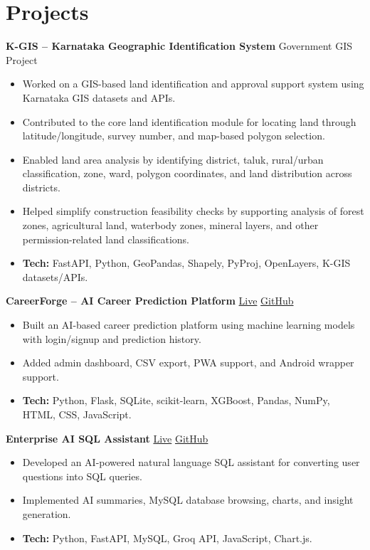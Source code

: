 \documentclass[a4paper,10pt]{article}
\newcommand{\entryspace}{\vspace{5pt}}
\begin{document}
\section*{Projects}
\textbf{K-GIS -- Karnataka Geographic Identification System} \hfill Government GIS Project
\begin{itemize}
    \item Worked on a GIS-based land identification and approval support system using Karnataka GIS datasets and APIs.
    \item Contributed to the core land identification module for locating land through latitude/longitude, survey number, and map-based polygon selection.
    \item Enabled land area analysis by identifying district, taluk, rural/urban classification, zone, ward, polygon coordinates, and land distribution across districts.
    \item Helped simplify construction feasibility checks by supporting analysis of forest zones, agricultural land, waterbody zones, mineral layers, and other permission-related land classifications.
    \item \textbf{Tech:} FastAPI, Python, GeoPandas, Shapely, PyProj, OpenLayers, K-GIS datasets/APIs.
\end{itemize}

\entryspace
\textbf{CareerForge -- AI Career Prediction Platform} \hfill
\href{https://careerforge-akvt.onrender.com}{Live} \textbar{}
\href{https://github.com/harsha-b-dev/CareerForge}{GitHub}
\begin{itemize}
    \item Built an AI-based career prediction platform using machine learning models with login/signup and prediction history.
    \item Added admin dashboard, CSV export, PWA support, and Android wrapper support.
    \item \textbf{Tech:} Python, Flask, SQLite, scikit-learn, XGBoost, Pandas, NumPy, HTML, CSS, JavaScript.
\end{itemize}

\entryspace
\textbf{Enterprise AI SQL Assistant} \hfill
\href{https://ai-sql-chatbot.onrender.com}{Live} \textbar{}
\href{https://github.com/harsha-b-dev/ai-sql-chatbot}{GitHub}
\begin{itemize}
    \item Developed an AI-powered natural language SQL assistant for converting user questions into SQL queries.
    \item Implemented AI summaries, MySQL database browsing, charts, and insight generation.
    \item \textbf{Tech:} Python, FastAPI, MySQL, Groq API, JavaScript, Chart.js.
\end{itemize}
\end{document}
